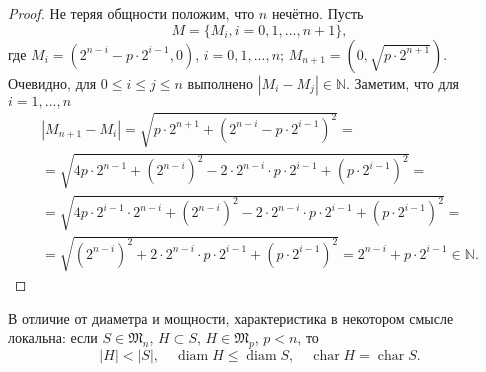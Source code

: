 \begin{proof}
	Не теряя общности положим, что $n$ нечётно.
	Пусть
	\begin{equation*}
		M = \{M_i, i =0,1,...,n+1\},
	\end{equation*}
	где
	$M_i = (2^{n-i}-p\cdot 2^{i-1},0)$, $i=0,1,...,n$;
	$M_{n+1} = (0,\sqrt{p \cdot 2^{n+1}})$.
	Очевидно, для $0\leqslant i \leqslant j \leqslant n$ выполнено
	$|M_i- M_j|\in\mathbb{N}$.
	Заметим, что для $i=1,...,n$
	\begin{multline*}
		|M_{n+1} - M_i| =
		\sqrt{p\cdot 2^{n+1} + (2^{n-i}-p\cdot2^{i-1})^2}
		=
		\\=
		\sqrt{4p\cdot 2^{n-1} + (2^{n-i})^2 - 2 \cdot 2^{n-i} \cdot p \cdot 2^{i-1} + (p\cdot 2^{i-1})^2}
		=
		\\=
		\sqrt{4p\cdot 2^{i-1} \cdot 2^{n-i} + (2^{n-i})^2 - 2 \cdot 2^{n-i} \cdot p \cdot 2^{i-1} + (p\cdot 2^{i-1})^2}
		=
		\\=
		\sqrt{(2^{n-i})^2 + 2 \cdot 2^{n-i} \cdot p \cdot 2^{i-1} + (p\cdot 2^{i-1})^2}
		=
		2^{n-i} + p\cdot 2^{i-1}
		\in\mathbb{N}
		.
	\end{multline*}
\end{proof}



В отличие от диаметра и мощности, характеристика в некотором смысле локальна:
если $S\in\mathfrak{M}_n$, $H \subset S$, $H\in\mathfrak{M}_{p}$, $p<n$,
то
\begin{equation*}
	|H| < |S|, \quad \operatorname{diam} H \leq \operatorname{diam} S, \quad \operatorname{char} H = \operatorname{char} S
	.
\end{equation*}
